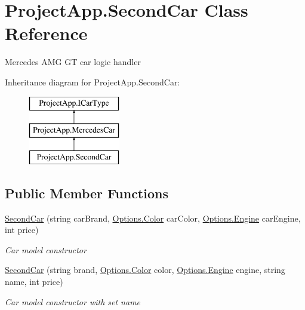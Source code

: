 \hypertarget{class_project_app_1_1_second_car}{}\section{Project\+App.\+Second\+Car Class Reference}
\label{class_project_app_1_1_second_car}


Mercedes A\+MG GT car logic handler  


Inheritance diagram for Project\+App.\+Second\+Car\+:\begin{figure}[H]
\begin{center}
\leavevmode
\includegraphics[height=3.000000cm]{class_project_app_1_1_second_car}
\end{center}
\end{figure}
\subsection*{Public Member Functions}
\begin{DoxyCompactItemize}
\item 
\mbox{\hyperlink{class_project_app_1_1_second_car_aa2e0c69381061f3528bd36ccda363309}{Second\+Car}} (string car\+Brand, \mbox{\hyperlink{class_project_app_1_1_options_aaa68b08af20deeebf73e6bc6de725c44}{Options.\+Color}} car\+Color, \mbox{\hyperlink{class_project_app_1_1_options_a95e313182e8122da719f7c8caefcc88d}{Options.\+Engine}} car\+Engine, int price)
\begin{DoxyCompactList}\small\item\em Car model constructor \end{DoxyCompactList}\item 
\mbox{\hyperlink{class_project_app_1_1_second_car_a847e6fc1040602604578d534ea0a3520}{Second\+Car}} (string brand, \mbox{\hyperlink{class_project_app_1_1_options_aaa68b08af20deeebf73e6bc6de725c44}{Options.\+Color}} color, \mbox{\hyperlink{class_project_app_1_1_options_a95e313182e8122da719f7c8caefcc88d}{Options.\+Engine}} engine, string name, int price)
\begin{DoxyCompactList}\small\item\em Car model constructor with set name \end{DoxyCompactList}\end{DoxyCompactItemize}
